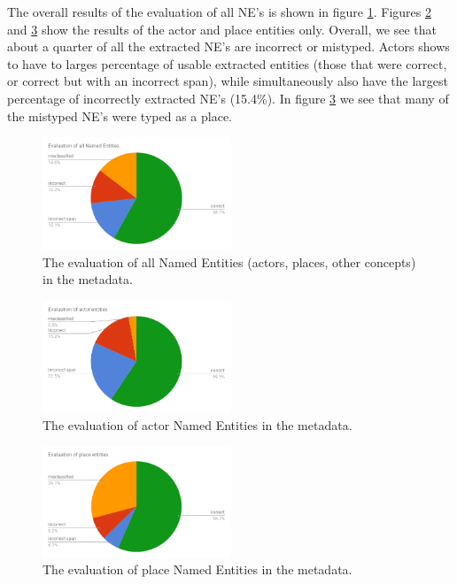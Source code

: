 \documentclass[a4paper, 10pt, conference]{ieeeconf}      %
\begin{document}
The overall results of the evaluation of all NE's is shown in figure \ref{NE metadata evaluation}. Figures \ref{Actor metadata evaluation} and \ref{Place metadata evaluation} show the results of the actor and place entities only. Overall, we see that about a quarter of all the extracted NE's are incorrect or mistyped. Actors shows to have to larges percentage of usable extracted entities (those that were correct, or correct but with an incorrect span), while simultaneously also have the largest percentage of incorrectly extracted NE's (15.4\%). In figure \ref{Place metadata evaluation} we see that many of the mistyped NE's were typed as a place.

\begin{figure}
  \centering
  \includegraphics[width= 0.5\textwidth]{EvalNEsPaper}
  \caption{The evaluation of all Named Entities (actors, places, other concepts) in the metadata.}
  \label{NE metadata evaluation}
\end{figure}

\begin{figure}
  \centering
  \includegraphics[width= 0.5\textwidth]{EvalActorsPaper}
  \caption{The evaluation of actor Named Entities in the metadata.}
  \label{Actor metadata evaluation}
\end{figure}

\begin{figure}
  \centering
  \includegraphics[width= 0.5\textwidth]{EvalPlacesPaper}
  \caption{The evaluation of place Named Entities in the metadata.}
  \label{Place metadata evaluation}
\end{figure}
\end{document}
